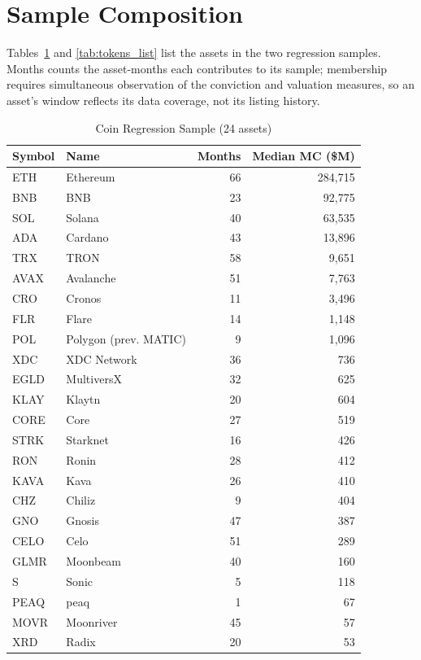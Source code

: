 \documentclass[12pt]{article}
\begin{document}
\clearpage
\section{Sample Composition}
\label{app:sample}

Tables~\ref{tab:coins_list} and \ref{tab:tokens_list} list the assets in the two
regression samples. Months counts the asset-months each contributes to its sample;
membership requires simultaneous observation of the conviction and valuation measures,
so an asset's window reflects its data coverage, not its listing history.

\begin{table}[p]
\centering
\caption{Coin Regression Sample (24 assets)}
\label{tab:coins_list}
\footnotesize
\begin{tabular}{llrr}
\toprule
Symbol & Name & Months & Median MC (\$M) \\
\midrule
ETH & Ethereum & 66 & 284,715 \\
BNB & BNB & 23 & 92,775 \\
SOL & Solana & 40 & 63,535 \\
ADA & Cardano & 43 & 13,896 \\
TRX & TRON & 58 & 9,651 \\
AVAX & Avalanche & 51 & 7,763 \\
CRO & Cronos & 11 & 3,496 \\
FLR & Flare & 14 & 1,148 \\
POL & Polygon (prev. MATIC) & 9 & 1,096 \\
XDC & XDC Network & 36 & 736 \\
EGLD & MultiversX & 32 & 625 \\
KLAY & Klaytn & 20 & 604 \\
CORE & Core & 27 & 519 \\
STRK & Starknet & 16 & 426 \\
RON & Ronin & 28 & 412 \\
KAVA & Kava & 26 & 410 \\
CHZ & Chiliz & 9 & 404 \\
GNO & Gnosis & 47 & 387 \\
CELO & Celo & 51 & 289 \\
GLMR & Moonbeam & 40 & 160 \\
S & Sonic & 5 & 118 \\
PEAQ & peaq & 1 & 67 \\
MOVR & Moonriver & 45 & 57 \\
XRD & Radix & 20 & 53 \\
\bottomrule
\end{tabular}
\end{table}
\end{document}
